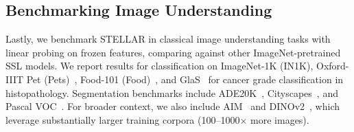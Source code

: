 \subsection{Benchmarking Image Understanding}

Lastly, we benchmark STELLAR in classical image understanding tasks with linear probing on frozen features, comparing against other ImageNet-pretrained SSL models. We report results for classification on ImageNet-1K (IN1K), Oxford-IIIT Pet (Pets)~\citep{parkhi2012cats}, Food-101 (Food)~\citep{bossard14}, and GlaS~\citep{sirinukunwattana2016gland} for cancer grade classification in histopathology. Segmentation benchmarks include ADE20K~\citep{zhou2017scene}, Cityscapes~\citep{cordts2016cityscapes}, and Pascal VOC~\citep{everingham2010pascal}.  For broader context, we also include AIM~\citep{el2024scalable} and DINOv2~\citep{oquab2023dinov2}, which leverage substantially larger training corpora (100–1000$\times$ more images).





